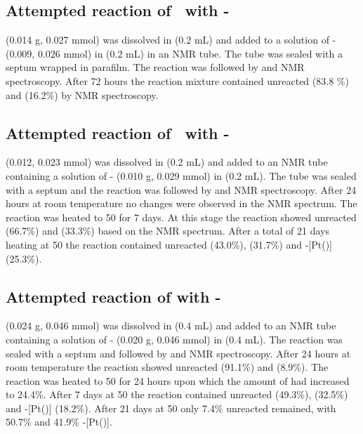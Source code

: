 \subsection*{Attempted reaction of \tButhixantphos\ with \cis-}

\tButhixantphos{} (0.014 g, 0.027 mmol) was dissolved in  (0.2 mL) and added to a solution of \cis- (0.009, 0.026 mmol) in  (0.2 mL) in an NMR tube.  The tube was sealed with a septum wrapped in parafilm.  The reaction was followed by \proton{} and \phosphorus{} NMR spectroscopy.  After 72 hours the reaction mixture contained unreacted \tButhixantphos{} (83.8 \%) and \tButhixantphos{}  (16.2\%) by \phosphorus{} NMR spectroscopy.  

\subsection*{Attempted reaction of \tButhixantphos\ with \trans-}

\tButhixantphos{} (0.012, 0.023 mmol) was dissolved in  (0.2 mL) and added to an NMR tube containing a solution of \trans- (0.010 g, 0.029 mmol) in  (0.2 mL). The tube was sealed with a septum and the reaction was followed by \proton{} and \phosphorus{} NMR spectroscopy.  After 24 hours at room temperature no changes were observed in the NMR spectrum.  The reaction was heated to 50 \degC for 7 days.  At this stage the reaction showed unreacted \tButhixantphos{} (66.7\%) and \tButhixantphos{} (33.3\%) based on the \phosphorus{} NMR spectrum.  After a total of 21 days heating at 50 \degC the reaction contained unreacted \tButhixantphos{} (43.0\%), \tButhixantphos{} (31.7\%) and \trans-[Pt(\tButhixantphos)] (25.3\%).  

\subsection*{Attempted reaction of \tButhixantphos with \trans-\ce{[Pt(CN^{t}Bu)2Cl2]}}

\tButhixantphos{} (0.024 g, 0.046 mmol) was dissolved in  (0.4 mL) and added to an NMR tube containing a solution of \trans- (0.020 g, 0.046 mmol) in  (0.4 mL).  The reaction was sealed with a septum and followed by \proton{} and \phosphorus{} NMR spectroscopy.  After 24 hours at room temperature the reaction showed unreacted \tButhixantphos{} (91.1\%) and \tButhixantphos{} (8.9\%).  The reaction was heated to 50 \degC{} for 24 hours upon which the amount of \tButhixantphos{} had increased to 24.4\%.  After 7 days at 50 \degC the reaction contained unreacted \tButhixantphos{} (49.3\%), \tButhixantphos{} (32.5\%) and \trans-[Pt(\tButhixantphos)] (18.2\%).  After 21 days at 50 \degC only 7.4\% unreacted \tButhixantphos remained, with 50.7\% \tButhixantphos{} and 41.9\% \trans-[Pt(\tButhixantphos)].  

